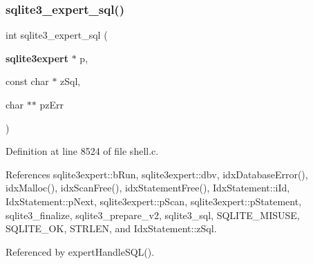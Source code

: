 \subsubsection{sqlite3\+\_\+expert\+\_\+sql()}
{\footnotesize\ttfamily int sqlite3\+\_\+expert\+\_\+sql (\begin{DoxyParamCaption}\item[{\textbf{ sqlite3expert} $\ast$}]{p,  }\item[{const char $\ast$}]{z\+Sql,  }\item[{char $\ast$$\ast$}]{pz\+Err }\end{DoxyParamCaption})}



Definition at line 8524 of file shell.\+c.



References sqlite3expert\+::b\+Run, sqlite3expert\+::dbv, idx\+Database\+Error(), idx\+Malloc(), idx\+Scan\+Free(), idx\+Statement\+Free(), Idx\+Statement\+::i\+Id, Idx\+Statement\+::p\+Next, sqlite3expert\+::p\+Scan, sqlite3expert\+::p\+Statement, sqlite3\+\_\+finalize, sqlite3\+\_\+prepare\+\_\+v2, sqlite3\+\_\+sql, S\+Q\+L\+I\+T\+E\+\_\+\+M\+I\+S\+U\+SE, S\+Q\+L\+I\+T\+E\+\_\+\+OK, S\+T\+R\+L\+EN, and Idx\+Statement\+::z\+Sql.



Referenced by expert\+Handle\+S\+Q\+L().


